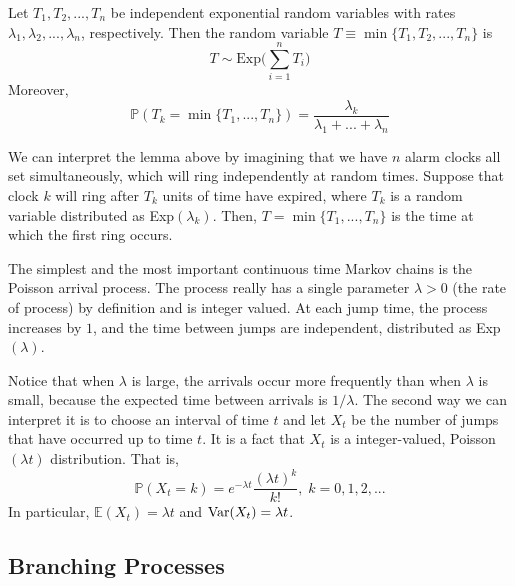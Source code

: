   \begin{lemma}
    Let $T_1, T_2, ..., T_n$ be independent exponential random variables with rates $\lambda_1, \lambda_2, ..., \lambda_n$, respectively. Then the random variable $T \equiv \min\{T_1, T_2, ..., T_n\}$ is
    \begin{equation}
      T \sim \text{Exp}\Big(\sum_{i=1}^n T_i\Big)
    \end{equation}
    Moreover, 
    \begin{equation}
      \mathbb{P}(T_k = \min\{T_1, ..., T_n\}) = \frac{\lambda_k}{\lambda_1 + ... + \lambda_n}
    \end{equation}
  \end{lemma}

  We can interpret the lemma above by imagining that we have $n$ alarm clocks all set simultaneously, which will ring independently at random times. Suppose that clock $k$ will ring after $T_k$ units of time have expired, where $T_k$ is a random variable distributed as Exp$(\lambda_k)$. Then, $T = \min\{T_1, ..., T_n\}$ is the time at which the first ring occurs. 

  \begin{example}
    The simplest and the most important continuous time Markov chains is the Poisson arrival process. The process really has a single parameter $\lambda >0$ (the rate of process) by definition and is integer valued. At each jump time, the process increases by $1$, and the time between jumps are independent, distributed as Exp$(\lambda)$. 

    Notice that when $\lambda$ is large, the arrivals occur more frequently than when $\lambda$ is small, because the expected time between arrivals is $1/\lambda$. The second way we can interpret it is to choose an interval of time $t$ and let $X_t$ be the number of jumps that have occurred up to time $t$. It is a fact that $X_t$ is a integer-valued, Poisson$(\lambda t)$ distribution. That is, 
    \begin{equation}
      \mathbb{P}(X_t = k) = e^{-\lambda t} \frac{(\lambda t)^k}{k!}, \; k = 0, 1, 2, ...
    \end{equation}
    In particular, $\mathbb{E}(X_t) = \lambda t$ and $\Var(X_t) = \lambda t$. 
  \end{example}

\subsection{Branching Processes}

